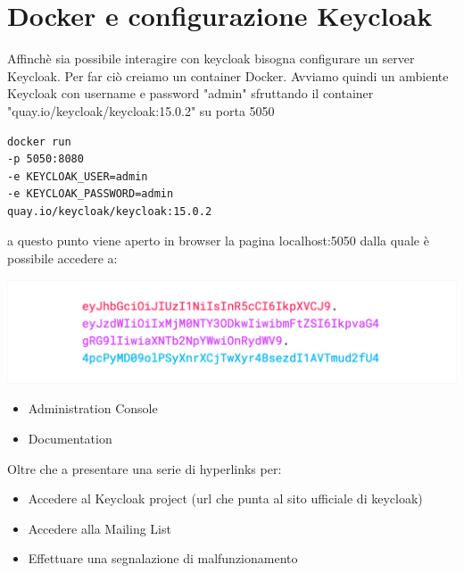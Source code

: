\documentclass[twoside]{report}
\begin{document}
\section{Docker e configurazione Keycloak}

Affinchè sia possibile interagire con keycloak bisogna configurare un server Keycloak. Per far ciò creiamo un container Docker.
\bigbreak
Avviamo quindi un ambiente Keycloak con username e password "admin" sfruttando il container "quay.io/keycloak/keycloak:15.0.2" su porta 5050

\begin{listing}[h!]
\begin{verbatim}
docker run
-p 5050:8080
-e KEYCLOAK_USER=admin
-e KEYCLOAK_PASSWORD=admin
quay.io/keycloak/keycloak:15.0.2
\end{verbatim} 
\end{listing}
\FloatBarrier

\bigbreak

a questo punto viene aperto in browser la pagina localhost:5050 dalla quale è possibile accedere a:


\begin{minipage}{\linewidth}
    \vspace{2mm}
    \centering
    \includegraphics[width= \linewidth]{1.png}
    \vspace{2mm}
\end{minipage}

\begin{itemize}
	\item Administration Console
	\item Documentation
\end{itemize}


Oltre che a presentare una serie di hyperlinks per:


\begin{itemize}
	\item Accedere al Keycloak project (url che punta al sito ufficiale di keycloak)
	\item Accedere alla Mailing List
	\item Effettuare una segnalazione di malfunzionamento
\end{itemize}
\end{document}
